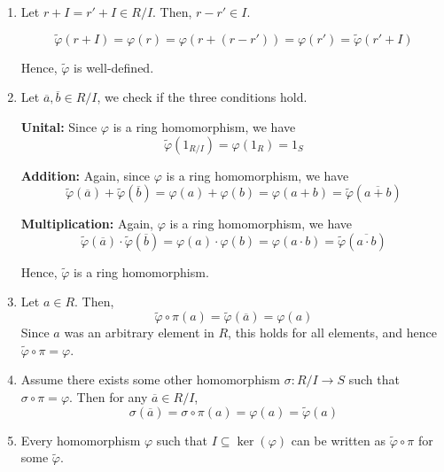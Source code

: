 \documentclass[Notebook.tex]{subfiles}
\begin{document}
\begin{solution}
    \bbni 
    \begin{enumerate}[label=(\alph*),ref=\theenumi\alph*]
        \item Let $r + I = r' +I \in R/I$. Then, $r - r' \in I$. 
        
        \[\widetilde{\varphi}(r+I) = \varphi(r) = \varphi(r + (r - r')) = \varphi(r') = \widetilde{\varphi}(r'+I)\]
        
        Hence, $\widetilde{\varphi}$ is well-defined.

        \item Let $\overline{a}, \overline{b} \in R/I$, we check if the three conditions hold. 
        
        \textbf{Unital:} Since $\varphi$ is a ring homomorphism, we have \[\widetilde{\varphi}(1_{R/I}) = \varphi(1_R) = 1_S\]  

        \textbf{Addition:} Again, since $\varphi$ is a ring homomorphism, we have
        \[\widetilde{\varphi}(\overline{a}) + \widetilde{\varphi}(\overline{b}) = \varphi(a) + \varphi(b) = \varphi(a+b) = \widetilde{\varphi}(\overline{a+b})\]


        \textbf{Multiplication:} Again, $\varphi$ is a ring homomorphism, we have
        \[\widetilde{\varphi}(\overline{a}) \cdot \widetilde{\varphi}(\overline{b}) = \varphi(a) \cdot \varphi(b) = \varphi(a \cdot b) = \widetilde{\varphi}(\overline{a\cdot b})\]

        Hence, $\widetilde{\varphi}$ is a ring homomorphism. 

        \item Let $a \in R$. Then, 
        \[\widetilde{\varphi} \circ \pi (a) = \widetilde{\varphi} (\overline{a}) = \varphi(a)\]
        Since $a$ was an arbitrary element in $R$, this holds for all elements, and hence $\widetilde{\varphi} \circ \pi = \varphi$. 

        \item Assume there exists some other homomorphism $\sigma: R/I \to S$ such that $\sigma \circ \pi = \varphi$. Then for any $\overline{a} \in R/I$,  
        \[ \sigma (\overline a) = \sigma \circ \pi (a) = \varphi(a) = \widetilde{\varphi}(a)\]

        \item Every homomorphism $\varphi$ such that $I \subseteq \ker(\varphi)$ can be written as $\widetilde{\varphi} \circ \pi$ for some $\widetilde{\varphi}$.   
    \end{enumerate}    
\end{solution}
\end{document}
